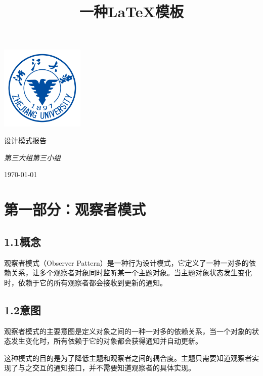 \documentclass[24pt,a4paper]{article}%
\title{\fontsize{18pt}{27pt}\selectfont%
	{\heiti%
		一种\LaTeX 模板}}%
\date{}%
\begin{document}
\begin{titlepage}
    \centering
    \includegraphics[width=0.3\textwidth]{image/zju_logo.png}\par\vspace{5cm}
    {\huge\songti 设计模式报告\par}
    \vspace{1cm}
    {\Large\itshape 第三大组第三小组\par}
    \vspace{7cm}

    \vfill
    {\large \today\par}
\end{titlepage}
\newpage

\begin{center}
    \kaishu
    \tableofcontents
    \setcounter{page}{0}
    \thispagestyle{empty} %
\end{center}
\newpage

\section*{\songti 第一部分：观察者模式}
\subsection*{\songti 1.1概念}
观察者模式（Observer Pattern）是一种行为设计模式，它定义了一种一对多的依赖关系，让多个观察者对象同时监听某一个主题对象。当主题对象状态发生变化时，依赖于它的所有观察者都会接收到更新的通知。
\subsection*{\songti 1.2意图}
观察者模式的主要意图是定义对象之间的一种一对多的依赖关系，当一个对象的状态发生变化时，所有依赖于它的对象都会获得通知并自动更新。

这种模式的目的是为了降低主题和观察者之间的耦合度。主题只需要知道观察者实现了与之交互的通知接口，并不需要知道观察者的具体实现。
\end{document}

